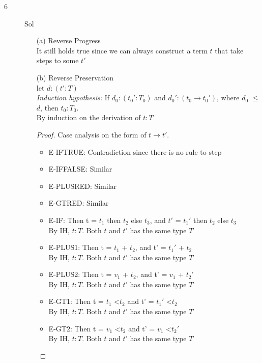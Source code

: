 \documentclass{article}
\begin{document}
\begin{description}
\begin{enumerate}
            \end{enumerate}
        \item[6]{Sol}
            \begin{enumerate}
                \item[(a)]{Reverse Progress}\\
                    It still holds true since we can always construct a term $t$ that take steps to some $t'$
                \item[(b)]{Reverse Preservation}\\
                    let $d:(t':T)$\\
                    \textit{Induction hypothesis:} If $d_0:(t_0':T_0)$ and $d_0':(t_0 \rightarrow t_0')$, where $d_0$ $\leq$ $d$, then $t_0:T_0$.\\
                    By induction on the derivation of $t:T$
                    \begin{proof}
                        Case analysis on the form of $t \rightarrow t'$.
                        \begin{itemize}
                            \item E-IFTRUE: Contradiction since there is no rule to step
                            \item E-IFFALSE: Similar
                            \item E-PLUSRED: Similar
                            \item E-GTRED: Similar
                            \item E-IF: Then t = $t_1$ then $t_2$ else $t_3$, and $t'$ = $t_1'$ then $t_2$ else $t_3$\\
                                By IH, $t:T$. Both $t$ and $t'$ has the same type $T$
                            \item E-PLUS1: Then t = $t_1$ + $t_2$, and t' = $t_1'$ + $t_2$\\
                                By IH, $t:T$. Both $t$ and $t'$ has the same type $T$
                            \item E-PLUS2: Then t = $v_1$ + $t_2$, and t' = $v_1$ + $t_2'$\\
                                By IH, $t:T$. Both $t$ and $t'$ has the same type $T$
                            \item E-GT1: Then t = $t_1$ \textless $t_2$ and t' = $t_1'$ \textless $t_2$\\
                                By IH, $t:T$. Both $t$ and $t'$ has the same type $T$
                            \item E-GT2: Then t = $v_1$ \textless $t_2$ and t' = $v_1$ \textless $t_2'$\\
                            By IH, $t:T$. Both $t$ and $t'$ has the same type $T$
                        \end{itemize}
                    \end{proof}


\end{enumerate}
\end{description}
\end{document}

